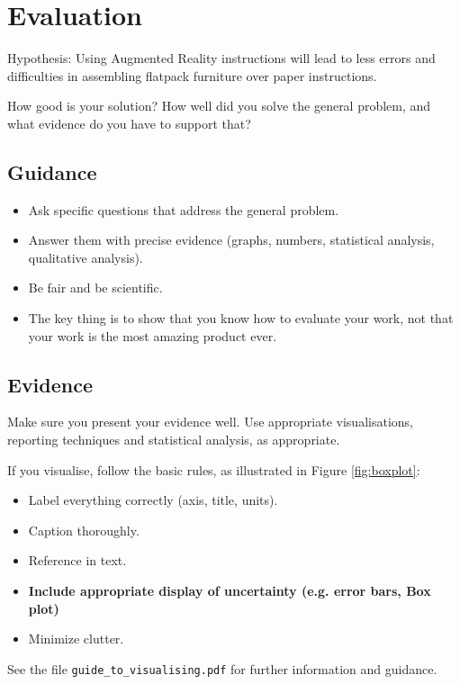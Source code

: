 \documentclass{l4proj}
\begin{document}
\chapter{Evaluation} 

Hypothesis: Using Augmented Reality instructions will lead to less errors and difficulties in assembling flatpack furniture over paper instructions.

How good is your solution? How well did you solve the general problem, and what evidence do you have to support that?

\section{Guidance}
\begin{itemize}
    \item
        Ask specific questions that address the general problem.
    \item
        Answer them with precise evidence (graphs, numbers, statistical
        analysis, qualitative analysis).
    \item
        Be fair and be scientific.
    \item
        The key thing is to show that you know how to evaluate your work, not
        that your work is the most amazing product ever.
\end{itemize}

\section{Evidence}
Make sure you present your evidence well. Use appropriate visualisations, reporting techniques and statistical analysis, as appropriate.

If you visualise, follow the basic rules, as illustrated in Figure \ref{fig:boxplot}:
\begin{itemize}
\item Label everything correctly (axis, title, units).
\item Caption thoroughly.
\item Reference in text.
\item \textbf{Include appropriate display of uncertainty (e.g. error bars, Box plot)}
\item Minimize clutter.
\end{itemize}

See the file \texttt{guide\_to\_visualising.pdf} for further information and guidance.
\end{document}
